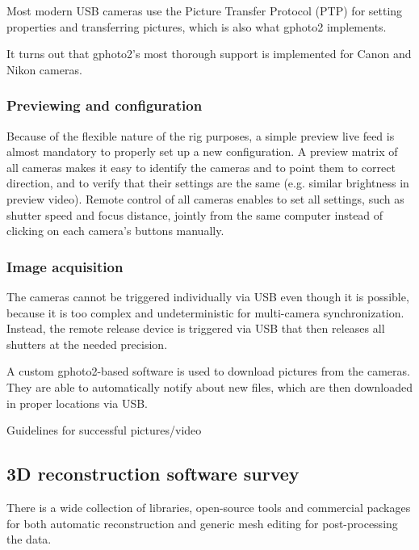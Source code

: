 Most modern USB cameras use the Picture Transfer Protocol (PTP) \cite{ptpTODO} for setting properties and transferring pictures, which is also what gphoto2 implements.

It turns out that gphoto2's most thorough support is implemented for Canon and Nikon cameras.


\subsubsection{Previewing and configuration} %

Because of the flexible nature of the rig purposes, a simple preview live feed is almost mandatory to properly set up a new configuration.
A preview matrix of all cameras makes it easy to identify the cameras and to point them to correct direction, and to verify that their settings are the same (e.g. similar brightness in preview video).
Remote control of all cameras enables to set all settings, such as shutter speed and focus distance, jointly from the same computer instead of clicking on each camera's buttons manually.



\subsubsection{Image acquisition} %

The cameras cannot be triggered individually via USB even though it is possible, because it is too complex and undeterministic for multi-camera synchronization.
Instead, the remote release device is triggered via USB that then releases all shutters at the needed precision.

A custom gphoto2-based software is used to download pictures from the cameras. They are able to automatically notify about new files, which are then downloaded in proper locations via USB.

Guidelines for successful pictures/video


\subsection{3D reconstruction software survey} %

 There is a wide collection of libraries, open-source tools and commercial packages for both automatic reconstruction and generic mesh editing for post-processing the data.

